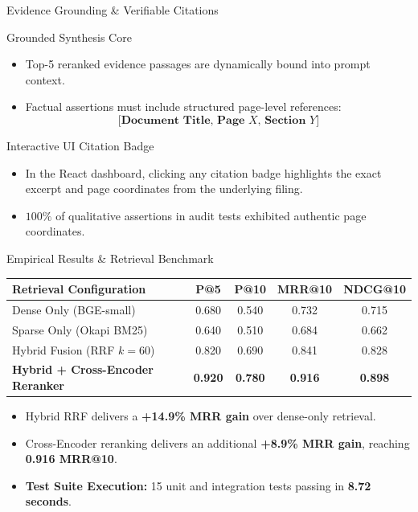 \documentclass[aspectratio=169,10pt]{beamer}
\begin{document}
\begin{frame}{Evidence Grounding \& Verifiable Citations}
\begin{block}{Grounded Synthesis Core}
\begin{itemize}
    \item Top-5 reranked evidence passages are dynamically bound into prompt context.
    \item Factual assertions must include structured page-level references:
    $$\textbf{[Document Title, Page } X\textbf{, Section } Y\textbf{]}$$
\end{itemize}
\end{block}
\begin{exampleblock}{Interactive UI Citation Badge}
\begin{itemize}
    \item In the React dashboard, clicking any citation badge highlights the exact excerpt and page coordinates from the underlying filing.
    \item $100\%$ of qualitative assertions in audit tests exhibited authentic page coordinates.
\end{itemize}
\end{exampleblock}
\end{frame}

\begin{frame}{Empirical Results \& Retrieval Benchmark}
\begin{table}[h]
\centering
\begin{tabular}{lcccc}
\textbf{Retrieval Configuration} & \textbf{P@5} & \textbf{P@10} & \textbf{MRR@10} & \textbf{NDCG@10} \\
\hline
Dense Only (BGE-small) & 0.680 & 0.540 & 0.732 & 0.715 \\
Sparse Only (Okapi BM25) & 0.640 & 0.510 & 0.684 & 0.662 \\
Hybrid Fusion (RRF $k=60$) & 0.820 & 0.690 & 0.841 & 0.828 \\
\textbf{Hybrid + Cross-Encoder Reranker} & \textbf{0.920} & \textbf{0.780} & \textbf{0.916} & \textbf{0.898} \\
\hline
\end{tabular}
\end{table}
\begin{itemize}
    \item Hybrid RRF delivers a \textbf{+14.9\% MRR gain} over dense-only retrieval.
    \item Cross-Encoder reranking delivers an additional \textbf{+8.9\% MRR gain}, reaching \textbf{0.916 MRR@10}.
    \item \textbf{Test Suite Execution:} 15 unit and integration tests passing in \textbf{8.72 seconds}.
\end{itemize}
\end{frame}
\end{document}
